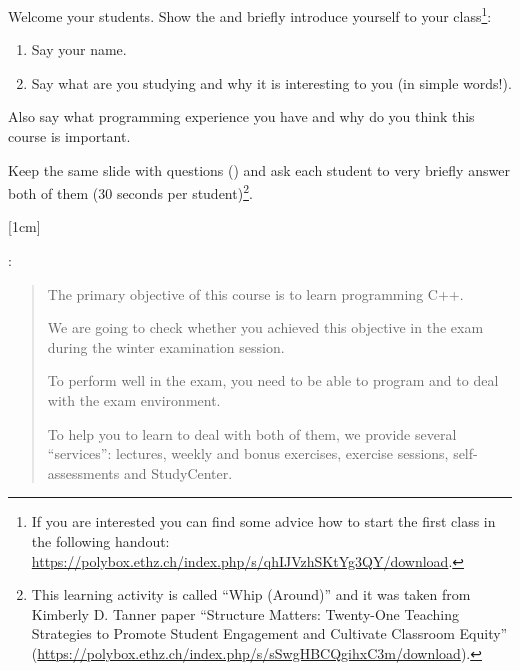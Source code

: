 
Welcome your students. Show the  and briefly introduce yourself
to your class\footnote{If you are interested you can find some advice
how to start the first class in the following handout:
\url{https://polybox.ethz.ch/index.php/s/qhIJVzhSKtYg3QY/download}.}:
\begin{enumerate}
    \item
        Say your name.
    \item
        Say what are you studying and why it is interesting to you (in
        simple words!).
\end{enumerate}

Also say what programming experience you have and why do you think this
course is important.


Keep the same slide with questions () and ask each student to
very briefly answer both of them (30 seconds per
student)\footnote{This learning activity is called “Whip (Around)” and
it was taken from Kimberly D. Tanner paper “Structure Matters:
Twenty-One Teaching Strategies to Promote Student Engagement and
Cultivate Classroom Equity”
(\url{https://polybox.ethz.ch/index.php/s/sSwgHBCQgihxC3m/download}).}.



[1cm]

:
\begin{quote}
    The primary objective of this course is to learn programming C++.

    We are going to check whether you achieved this objective in the
    exam during the winter examination session.

    To perform well in the exam, you need to be able to program and to
    deal with the exam environment.

    To help you to learn to deal with both of them, we provide several
    “services”: lectures, weekly and bonus exercises, exercise sessions,
    self-assessments and StudyCenter.
\end{quote}

\quest


